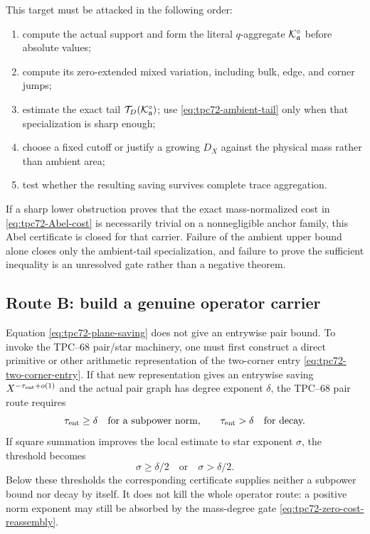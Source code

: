 This target must be attacked in the following order:
\begin{enumerate}[label=\textup{(A\arabic*)},leftmargin=3.6em]
 \item compute the actual support and form the literal \(q\)-aggregate
       \(\mathcal K_{\mathfrak a}^{\circ}\) before absolute values;
 \item compute its zero-extended mixed variation, including bulk, edge, and
       corner jumps;
 \item estimate the exact tail
       \(\mathcal T_D(\mathcal K_{\mathfrak a}^{\circ})\); use
       \eqref{eq:tpc72-ambient-tail} only when that specialization is sharp
       enough;
 \item choose a fixed cutoff or justify a growing \(D_X\) against the
       physical mass rather than ambient area;
 \item test whether the resulting saving survives complete trace
       aggregation.
\end{enumerate}
If a sharp lower obstruction proves that the exact mass-normalized cost in
\eqref{eq:tpc72-Abel-cost} is necessarily trivial on a nonnegligible anchor
family, this Abel certificate is closed for that carrier.  Failure of the
ambient upper bound alone closes only the ambient-tail specialization, and
failure to prove the sufficient inequality is an unresolved gate rather
than a negative theorem.

\subsection{Route B: build a genuine operator carrier}

Equation \eqref{eq:tpc72-plane-saving} does not give an entrywise pair
bound.  To invoke the TPC--68 pair/star machinery, one must first construct
a direct primitive or other arithmetic representation of the two-corner
entry \eqref{eq:tpc72-two-corner-entry}.  If that new representation gives
an entrywise saving \(X^{-\tau_{\rm ent}+o(1)}\) and the actual pair graph
has degree exponent \(\delta\), the TPC--68 pair route requires
\begin{equation}
 \tau_{\rm ent}\ge\delta
 \quad\text{for a subpower norm,}
 \qquad
 \tau_{\rm ent}>\delta
 \quad\text{for decay.}
 \label{eq:tpc72-pair-threshold}
\end{equation}
If square summation improves the local estimate to star exponent \(\sigma\),
the threshold becomes
\begin{equation}
 \sigma\ge\delta/2
 \quad\text{or}\quad
 \sigma>\delta/2.
 \label{eq:tpc72-star-threshold}
\end{equation}
Below these thresholds the corresponding certificate supplies neither a
subpower bound nor decay by itself.  It does not kill the whole operator
route: a positive norm exponent may still be absorbed by the mass-degree
gate \eqref{eq:tpc72-zero-cost-reassembly}.

